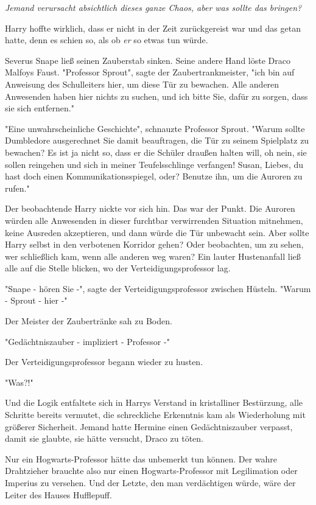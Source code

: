 {\emph{Jemand verursacht absichtlich dieses ganze Chaos, aber was sollte das bringen?}

Harry hoffte wirklich, dass er nicht in der Zeit zurückgereist war und das getan hatte, denn es schien so, als ob \emph{er} so etwas tun würde.

Severus Snape ließ seinen Zauberstab sinken. Seine andere Hand löste Draco Malfoys Faust. "Professor Sprout", sagte der Zaubertrankmeister, "ich bin auf Anweisung des Schulleiters hier, um diese Tür zu bewachen. Alle anderen Anwesenden haben hier nichts zu suchen, und ich bitte Sie, dafür zu sorgen, dass sie sich entfernen."

"Eine unwahrscheinliche Geschichte", schnauzte Professor Sprout. "Warum sollte Dumbledore ausgerechnet Sie damit beauftragen, die Tür zu seinem Spielplatz zu bewachen? Es ist ja nicht so, dass er die Schüler draußen halten will, oh nein, sie sollen reingehen und sich in meiner Teufelsschlinge verfangen! Susan, Liebes, du hast doch einen Kommunikationsspiegel, oder? Benutze ihn, um die Auroren zu rufen."

Der beobachtende Harry nickte vor sich hin. Das war der Punkt. Die Auroren würden alle Anwesenden in dieser furchtbar verwirrenden Situation mitnehmen, keine Ausreden akzeptieren, und dann würde die Tür unbewacht sein. Aber sollte Harry selbst in den verbotenen Korridor gehen? Oder beobachten, um zu sehen, wer schließlich kam, wenn alle anderen weg waren? Ein lauter Hustenanfall ließ alle auf die Stelle blicken, wo der Verteidigungsprofessor lag.

"Snape - hören Sie -", sagte der Verteidigungsprofessor zwischen Hüsteln. "Warum - Sprout - hier -"

Der Meister der Zaubertränke sah zu Boden.

"Gedächtniszauber - impliziert - Professor -"

Der Verteidigungsprofessor begann wieder zu husten.

"Was?!"

Und die Logik entfaltete sich in Harrys Verstand in kristalliner Bestürzung, alle Schritte bereits vermutet, die schreckliche Erkenntnis kam als Wiederholung mit größerer Sicherheit. Jemand hatte Hermine einen Gedächtniszauber verpasst, damit sie glaubte, sie hätte versucht, Draco zu töten.

Nur ein Hogwarts-Professor hätte das unbemerkt tun können. Der wahre Drahtzieher brauchte also nur einen Hogwarts-Professor mit Legilimation oder Imperius zu versehen. Und der Letzte, den man verdächtigen würde, wäre der Leiter des Hauses Hufflepuff.

}

